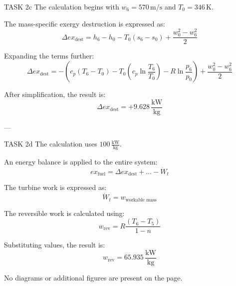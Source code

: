 TASK 2c  
The calculation begins with \( w_6 = 570 \, \text{m/s} \) and \( T_0 = 346 \, \text{K} \).  

The mass-specific exergy destruction is expressed as:  
\[
\Delta ex_{\text{dest}} = h_6 - h_0 - T_0 (s_6 - s_0) + \frac{w_0^2 - w_6^2}{2}
\]  

Expanding the terms further:  
\[
\Delta ex_{\text{dest}} = - (c_p (T_6 - T_0) - T_0 (c_p \ln \frac{T_6}{T_0}) - R \ln \frac{p_6}{p_0}) + \frac{w_0^2 - w_6^2}{2}
\]  

After simplification, the result is:  
\[
\Delta ex_{\text{dest}} = + 9.628 \, \frac{\text{kW}}{\text{kg}}
\]  

---

TASK 2d  
The calculation uses \( 100 \, \frac{\text{kW}}{\text{kg}} \).  

An energy balance is applied to the entire system:  
\[
ex_{\text{fuel}} = \Delta ex_{\text{dest}} + \dots - \dot{W}_t
\]  

The turbine work is expressed as:  
\[
\dot{W}_t = w_{\text{workable mass}}
\]  

The reversible work is calculated using:  
\[
w_{\text{rev}} = R \frac{(T_6 - T_5)}{1 - n}
\]  

Substituting values, the result is:  
\[
w_{\text{rev}} = 65.935 \, \frac{\text{kW}}{\text{kg}}
\]  

No diagrams or additional figures are present on the page.
